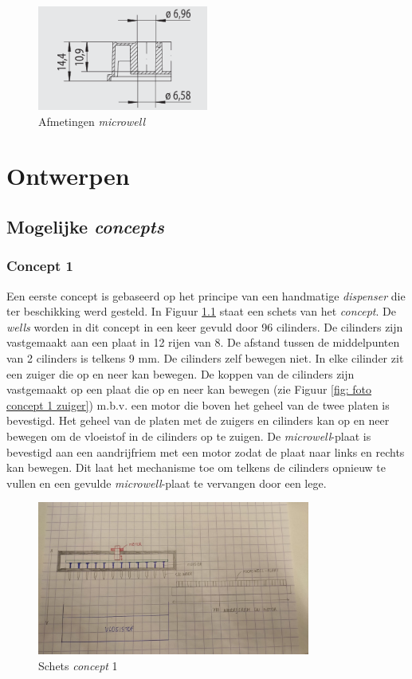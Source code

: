 \documentclass[a4paper,twoside,kulak]{kulakreport} %
\begin{document}
\begin{figure}[h]
	\centering
	\includegraphics[width=0.5\textwidth]{AfmetingenMicrowell.png}
	\caption{Afmetingen \textit{microwell}}
	\label{fig: afmetingenMicrowellplaat}
	
\end{figure} 


\chapter{Ontwerpen} 
\section{Mogelijke \textit{concepts}}
\subsection{Concept 1}
Een eerste concept is gebaseerd op het principe van een handmatige \textit{dispenser} die ter beschikking werd gesteld. In Figuur \ref{fig: schets concept 1} staat een schets van het \textit{concept}. De \textit{wells} worden in dit concept in een keer gevuld door 96 cilinders. De cilinders zijn vastgemaakt aan een plaat in 12 rijen van 8. De afstand tussen de middelpunten van 2 cilinders is telkens 9 mm. De cilinders zelf bewegen niet. In elke cilinder zit een zuiger die op en neer kan bewegen. De koppen van de cilinders zijn vastgemaakt op een plaat die op en neer kan bewegen (zie Figuur \ref{fig: foto concept 1 zuiger}) m.b.v. een motor die boven het geheel van de twee platen is bevestigd. Het geheel van de platen met de zuigers en cilinders kan op en neer bewegen om de vloeistof in de cilinders op te zuigen. De \textit{microwell}-plaat is bevestigd aan een aandrijfriem met een motor zodat de plaat naar links en rechts kan bewegen. Dit laat het mechanisme toe om telkens de cilinders opnieuw te vullen en een gevulde \textit{microwell}-plaat te vervangen door een lege.  

\begin{figure}[h]
	\centering
	\includegraphics[width=0.8\textwidth]{fotoConcept1.jpg}
	\caption{Schets \textit{concept} 1}
	\label{fig: schets concept 1}
	
\end{figure} 
\end{document}
